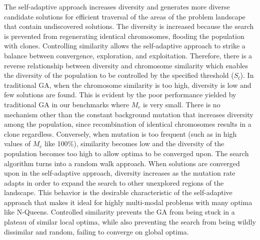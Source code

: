 \documentclass[conference]{IEEEtran}
\begin{document}
The self-adaptive approach increases diversity and generates more diverse candidate solutions for efficient traversal of the areas of the problem landscape that contain undiscovered solutions. The diversity is increased because the search is prevented from regenerating identical chromosomes, flooding the population with clones. Controlling similarity allows the self-adaptive approach to strike a balance between convergence, exploration, and exploitation. Therefore, there is a reverse relationship between diversity and chromosome similarity which enables the diversity of the population to be controlled by the specified threshold ($S_{t}$). In traditional GA, when the chromosome similarity is too high, diversity is low and few solutions are found. This is evident by the poor performance yielded by traditional GA in our benchmarks where $M_{c}$ is very small. There is no mechanism other than the constant background mutation that increases diversity among the population, since recombination of identical chromosomes results in a clone regardless. Conversely, when mutation is too frequent (such as in high values of $M_{c}$ like 100\%), similarity becomes low and the diversity of the population becomes too high to allow optima to be converged upon. The search algorithm turns into a random walk approach. When solutions are converged upon in the self-adaptive approach, diversity increases as the mutation rate adapts in order to expand the search to other unexplored regions of the landscape. This behavior is the desirable characteristic of the self-adaptive approach that makes it ideal for highly multi-modal problems with many optima like N-Queens. Controlled similarity prevents the GA from being stuck in a plateau of similar local optima, while also preventing the search from being wildly dissimilar and random, failing to converge on global optima.
\end{document}
